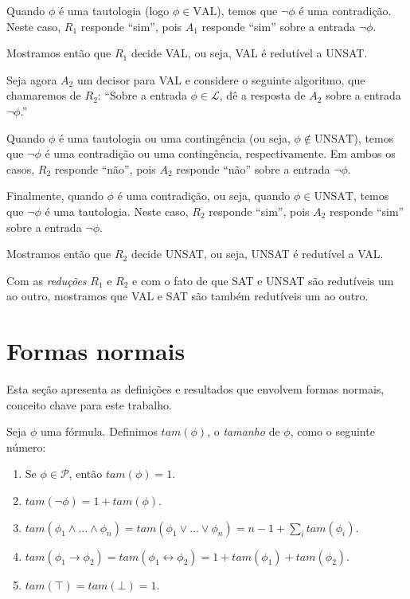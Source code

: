 Quando $\phi$ é uma tautologia (logo $\phi \in \text{VAL}$), temos que $\neg \phi$ é uma contradição. Neste caso, $R_1$ responde ``sim'', pois $A_1$ responde ``sim'' sobre a entrada $\neg \phi$.

Mostramos então que $R_1$ decide VAL, ou seja, VAL é redutível a UNSAT.

Seja agora $A_2$ um decisor para VAL e considere o seguinte algoritmo, que chamaremos de $R_2$: ``Sobre a entrada $\phi \in \mathcal{L}$, dê a resposta de $A_2$ sobre a entrada $\neg \phi$.''

Quando $\phi$ é uma tautologia ou uma contingência (ou seja, $\phi \notin \text{UNSAT}$), temos que $\neg \phi$ é uma contradição ou uma contingência, respectivamente. Em ambos os casos, $R_2$ responde ``não'', pois $A_2$ responde ``não'' sobre a entrada $\neg \phi$.

Finalmente, quando $\phi$ é uma contradição, ou seja, quando $\phi \in \text{UNSAT}$, temos que $\neg \phi$ é uma tautologia. Neste caso, $R_2$ responde ``sim'', pois $A_2$ responde ``sim'' sobre a entrada $\neg \phi$.

Mostramos então que $R_2$ decide UNSAT, ou seja, UNSAT é redutível a VAL.

Com as \emph{reduções} $R_1$ e $R_2$ e com o fato de que SAT e UNSAT são redutíveis um ao outro, mostramos que VAL e SAT são também redutíveis um ao outro.

\section{Formas normais}

\indent

Esta seção apresenta as definições e resultados que envolvem formas normais, conceito chave para este trabalho.

\begin{definition}
	Seja $\phi$ uma fórmula. Definimos $tam(\phi)$, o \emph{tamanho} de $\phi$, como o seguinte número:
	\begin{enumerate}
		\item Se $\phi \in \mathcal{P}$, então $tam(\phi) = 1$.
		\item $tam(\neg \phi) = 1 + tam(\phi)$.
		\item $tam(\phi_1 \wedge ... \wedge \phi_n) = tam(\phi_1 \vee ... \vee \phi_n) = n - 1 + \sum_i tam(\phi_i)$.
		\item $tam(\phi_1 \rightarrow \phi_2) = tam(\phi_1 \leftrightarrow \phi_2) = 1 + tam(\phi_1) + tam(\phi_2)$.
		\item $tam(\top) = tam(\bot) = 1$.
	\end{enumerate}
\end{definition}

